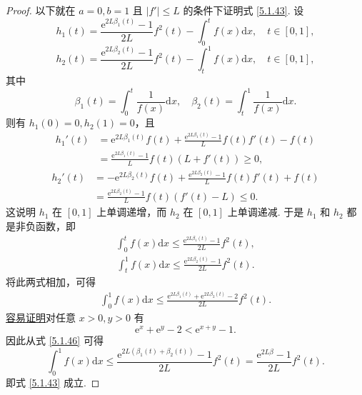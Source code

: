 \documentclass[../../main.tex]{subfiles}%
\begin{document}
\begin{proof}
以下就在 $a = 0, b = 1$ 且 $|f'| \leqslant L$ 的条件下证明式 \eqref{5.1.43}. 设
$$h_1(t) = \frac{\mathrm{e}^{2L\beta_1(t)} - 1}{2L} f^2(t) - \int_0^t f(x) \mathrm{d}x, \quad t \in [0,1],$$
$$h_2(t) = \frac{\mathrm{e}^{2L\beta_2(t)} - 1}{2L} f^2(t) - \int_t^1 f(x) \mathrm{d}x, \quad t \in [0,1],$$
其中
$$\beta_1(t) = \int_0^t \frac{1}{f(x)} \mathrm{d}x, \quad \beta_2(t) = \int_t^1 \frac{1}{f(x)} \mathrm{d}x.$$
则有 $h_1(0) = 0, h_2(1) = 0$，且
$$
\begin{aligned}
h_1'(t) &= \mathrm{e}^{2L\beta_1(t)} f(t) + \frac{\mathrm{e}^{2L\beta_1(t)} - 1}{L} f(t) f'(t) - f(t) \\
&= \frac{\mathrm{e}^{2L\beta_1(t)} - 1}{L} f(t) (L + f'(t)) \geqslant 0,
\end{aligned}
$$
$$
\begin{aligned}
h_2'(t) &= -\mathrm{e}^{2L\beta_2(t)} f(t) + \frac{\mathrm{e}^{2L\beta_2(t)} - 1}{L} f(t) f'(t) + f(t) \\
&= \frac{\mathrm{e}^{2L\beta_2(t)} - 1}{L} f(t) (f'(t) - L) \leqslant 0.
\end{aligned}
$$
这说明 $h_1$ 在 $[0,1]$ 上单调递增，而 $h_2$ 在 $[0,1]$ 上单调递减. 于是 $h_1$ 和 $h_2$ 都是非负函数，即
\begin{align}
\int_0^t f(x) \mathrm{d}x \leqslant \frac{\mathrm{e}^{2L\beta_1(t)} - 1}{2L} f^2(t), \label{5.1.44}
\end{align}
\begin{align}
\int_t^1 f(x) \mathrm{d}x \leqslant \frac{\mathrm{e}^{2L\beta_2(t)} - 1}{2L} f^2(t). \label{5.1.45}
\end{align}
将此两式相加，可得
\begin{align}
\int_0^1 f(x) \mathrm{d}x \leqslant \frac{\mathrm{e}^{2L\beta_1(t)} + \mathrm{e}^{2L\beta_2(t)} - 2}{2L} f^2(t). \label{5.1.46}
\end{align}
\hyperref[proposition:指数对数函数不等式3]{容易证明}对任意 $x > 0, y > 0$ 有
$$\mathrm{e}^x + \mathrm{e}^y - 2 < \mathrm{e}^{x + y} - 1.$$
因此从式 \eqref{5.1.46} 可得
$$\int_0^1 f(x) \mathrm{d}x \leqslant \frac{\mathrm{e}^{2L(\beta_1(t) + \beta_2(t))} - 1}{2L} f^2(t) = \frac{\mathrm{e}^{2L\beta} - 1}{2L} f^2(t).$$
即式 \eqref{5.1.43} 成立.

\end{proof}
\end{document}
